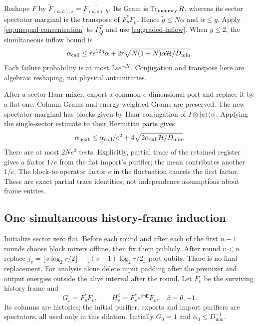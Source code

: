 Reshape $F$ by $\widetilde F_{(a,h),s}=\overline{F_{(a,s),h}}$.
Its Gram is $\operatorname{Tr}_{\rm memory}R$, whereas its sector spectator marginal
is the transpose of $F_p^*F_p$. Hence $\widetilde g\leq N\alpha$
and $\widetilde\alpha\leq g$. Apply
\eqref{eq:unequal-concentration} to $\Gamma_Q^T$ and use
\eqref{eq:graded-inflow}. When $g\leq2$, the simultaneous inflow bound is
\begin{equation}\label{eq:graded-spectator-recursion}
 \alpha_{\rm call}\leq re^{12\eta}\alpha+
 2r\sqrt{N(1+N)\alpha\mathcal H/D_{\min}}.
\end{equation}
Each failure probability is at most $2s e^{-\mathcal H}$.
Conjugation and transpose here are algebraic reshaping, not physical
antiunitaries.

After a sector Haar mixer, export a common $e$-dimensional port and
replace it by a flat one. Column Grams and energy-weighted Grams are
preserved. The new spectator marginal has blocks given by Haar
conjugation of $I\otimes|u\rangle\langle v|$. Applying the single-sector
estimate to their Hermitian parts gives
\begin{equation}\label{eq:graded-export}
 \alpha_{\rm next}\leq\alpha_{\rm call}/e^2+
 4\sqrt{2\alpha_{\rm call}\mathcal H/D_{\min}}.
\end{equation}
There are at most $2Ne^2$ tests. Explicitly, partial trace of the
retained register gives a factor $1/e$ from the flat import's purifier;
the mean contributes another $1/e$. The block-to-operator factor $e$
in the fluctuation cancels the first factor. These are exact partial
trace identities, not independence assumptions about frame entries.

\subsection{One simultaneous history-frame induction}
Initialize sector zero flat. Before each round and after each of the
first $n-1$ rounds choose block mixers offline, then fix them publicly.
After round $v<n$ replace
$j_v=\lfloor v\log_2r/2\rfloor-\lfloor(v-1)\log_2r/2\rfloor$
port qubits. There is no final replacement.
For analysis alone delete input padding after the premixer and output
energies outside the alive interval after the round. Let $F_v$ be the
surviving history frame and
\[
 G_v=F_v^*F_v,\qquad H_v^\beta=F_v^*e^{\beta\eta\mathsf E}F_v,
 \quad\beta=\theta,-1.
\]
Its columns are histories; the initial purifier, exports and import
purifiers are spectators, all used only in this dilation. Initially
$G_0=1$ and $\alpha_0\leq D_{\min}^{-1}$.

